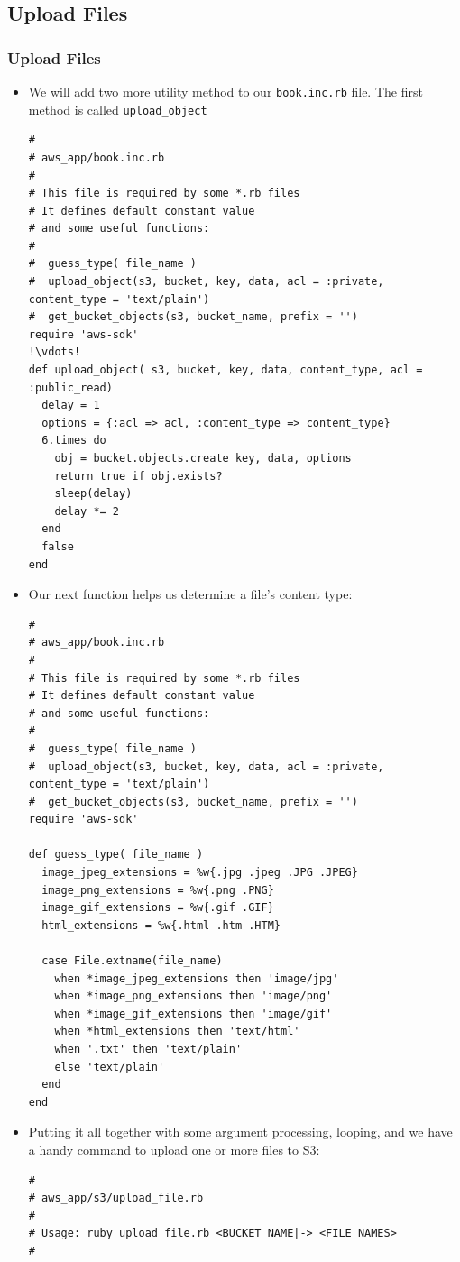 \documentclass{beamer}
\begin{document}
\subsection{Upload Files}
\begin{frame}
\frametitle{Upload Files}
\begin{itemize}
 \item We will add two more utility method to our \texttt{book.inc.rb} file. The first method is called \texttt{upload\_object}

\lstset{language=Ruby, style=eclipse}
\begin{lstlisting}[escapechar=!]
#
# aws_app/book.inc.rb
#
# This file is required by some *.rb files
# It defines default constant value
# and some useful functions:
#
#  guess_type( file_name )
#  upload_object(s3, bucket, key, data, acl = :private, content_type = 'text/plain')
#  get_bucket_objects(s3, bucket_name, prefix = '')
require 'aws-sdk'
!\vdots!
def upload_object( s3, bucket, key, data, content_type, acl = :public_read)
  delay = 1
  options = {:acl => acl, :content_type => content_type}
  6.times do
    obj = bucket.objects.create key, data, options
    return true if obj.exists?
    sleep(delay)
    delay *= 2
  end
  false
end
\end{lstlisting}

\item Our next function helps us determine a file's content type:

\lstset{language=Ruby, style=eclipse}
\begin{lstlisting}[escapechar=!]
#
# aws_app/book.inc.rb
#
# This file is required by some *.rb files
# It defines default constant value
# and some useful functions:
#
#  guess_type( file_name )
#  upload_object(s3, bucket, key, data, acl = :private, content_type = 'text/plain')
#  get_bucket_objects(s3, bucket_name, prefix = '')
require 'aws-sdk'

def guess_type( file_name )
  image_jpeg_extensions = %w{.jpg .jpeg .JPG .JPEG}
  image_png_extensions = %w{.png .PNG}
  image_gif_extensions = %w{.gif .GIF}
  html_extensions = %w{.html .htm .HTM}

  case File.extname(file_name)
    when *image_jpeg_extensions then 'image/jpg'
    when *image_png_extensions then 'image/png'
    when *image_gif_extensions then 'image/gif'
    when *html_extensions then 'text/html'
    when '.txt' then 'text/plain'
    else 'text/plain'
  end
end
\end{lstlisting}
\item Putting it all together with some argument processing, looping, and
we have a handy command to upload one or more files to S3:
\lstset{language=Ruby, style=eclipse}
\begin{lstlisting}[escapechar=!]
#
# aws_app/s3/upload_file.rb
#
# Usage: ruby upload_file.rb <BUCKET_NAME|-> <FILE_NAMES>
#


\end{lstlisting}
\end{itemize}
\end{frame}
\end{document}
